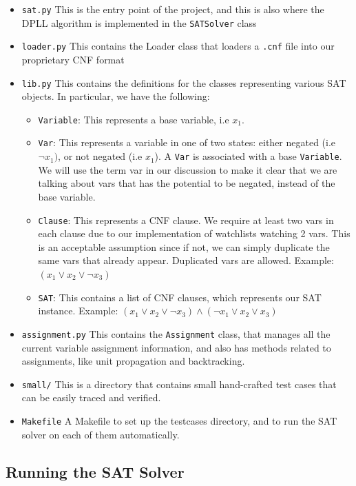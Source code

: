 \documentclass[11pt]{article}
\begin{document}
\begin{itemize}
  \item \texttt{sat.py} This is the entry point of the project, and this is also where the DPLL algorithm is implemented  in the \texttt{SATSolver} class
  \item \texttt{loader.py} This contains the \textsf{Loader} class that loaders a \texttt{.cnf} file into our proprietary CNF format
  \item \texttt{lib.py} This contains the definitions for the classes representing various SAT objects. In particular, we have the following:
    \begin{itemize}
      \item \texttt{Variable}: This represents a base variable, i.e $x_1$.
      \item \texttt{Var}: This represents a variable in one of two states: either negated (i.e $\neg x_1)$, or not negated (i.e $x_1$). A \texttt{Var} is associated with a base \texttt{Variable}. We will use the term var in our discussion to make it clear that we are talking about vars that has the potential to be negated, instead of the base variable.
      \item \texttt{Clause}: This represents a CNF clause. We require at least two vars in each clause due to our implementation of watchlists watching 2 vars. This is an acceptable assumption since if not, we can simply duplicate the same vars that already appear. Duplicated vars are allowed. Example: $(x_1 \vee x_2 \vee \neg x_3)$
      \item \texttt{SAT}: This contains a list of CNF clauses, which represents our SAT instance. Example: $(x_1 \vee x_2 \vee \neg x_3) \wedge (\neg x_1 \vee x_2 \vee x_3)$
    \end{itemize}
  \item \texttt{assignment.py} This contains the \texttt{Assignment} class, that manages all the current variable assignment information, and also has methods related to assignments, like unit propagation and backtracking.
  \item \texttt{small/} This is a directory that contains small hand-crafted test cases that can be easily traced and verified.
  \item \texttt{Makefile} A Makefile to set up the testcases directory, and to run the SAT solver on each of them automatically.
\end{itemize}

\subsection{Running the SAT Solver}
\end{document}
